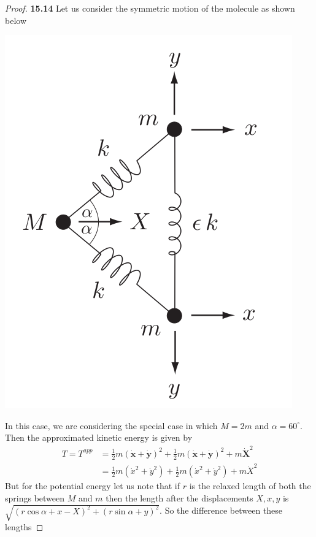 \documentclass[11pt]{article}
\theoremstyle{definition}
\begin{document}
\begin{proof}{\textbf{15.14}}
    Let us consider the symmetric motion of the molecule as shown below
    \begin{center}
        \includegraphics[scale=0.45]{ch15-14.png}
    \end{center}
    In this case, we are considering the special case in which $M = 2m$ and
    $\alpha = 60^\circ$. Then the approximated kinetic energy is given by
    \begin{align*}
        T = T^{app} &= \frac{1}{2}m(\bm{\dot{x}} + \bm{\dot{y}})^2
        + \frac{1}{2}m(\bm{\dot{x}} + \bm{\dot{y}})^2 + m\bm{\dot{X}}^2\\
            &= \frac{1}{2}m(\dot{x}^2 + \dot{y}^2)
        + \frac{1}{2}m(\dot{x}^2 + \dot{y}^2) + m\dot{X}^2
    \end{align*}
    But for the potential energy let us note that if $r$ is the relaxed length
    of both the springs between $M$ and $m$ then the length after
    the displacements $X, x, y$ is
    $\sqrt{(r\cos\alpha + x - X)^2 + (r\sin\alpha + y)^2}$.
    So the difference between these lengths

\end{proof}
\end{document}
